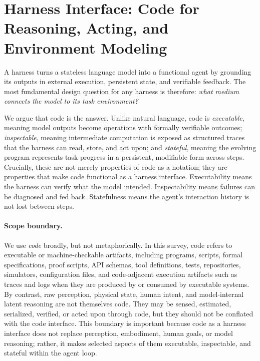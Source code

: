 \documentclass{llmxive}
\begin{document}
\tableofcontents


\section{Harness Interface: Code for Reasoning, Acting, and
Environment Modeling}
\label{sec:foundations}

A harness turns a stateless language model into a functional 
agent by grounding its outputs in external execution, persistent 
state, and verifiable feedback. The most fundamental design 
question for any harness is therefore: \emph{what medium 
connects the model to its task environment?}

We argue that code is the answer. Unlike natural language, code 
is \emph{executable}, meaning model outputs become operations 
with formally verifiable outcomes; \emph{inspectable}, meaning 
intermediate computation is exposed as structured traces that 
the harness can read, store, and act upon; and \emph{stateful}, 
meaning the evolving program represents task progress in a 
persistent, modifiable form across steps. Crucially, these are 
not merely properties of code as a notation; they are properties 
that make code functional as a harness interface. Executability 
means the harness can verify what the model intended. 
Inspectability means failures can be diagnosed and fed back. 
Statefulness means the agent's interaction history is not lost 
between steps.


\paragraph{Scope boundary.}
We use \emph{code} broadly, but not metaphorically. In this
survey, code refers to executable or machine-checkable artifacts,
including programs, scripts, formal specifications, proof scripts,
API schemas, tool definitions, tests, repositories, simulators,
configuration files, and code-adjacent execution artifacts such as
traces and logs when they are produced by or consumed by executable
systems. By contrast, raw perception, physical state, human intent,
and model-internal latent reasoning are not themselves code.
They may be sensed, estimated, serialized, verified, or acted upon
through code, but they should not be conflated with the code
interface. This boundary is important because code as a harness
interface does not replace perception, embodiment, human goals, or
model reasoning; rather, it makes selected aspects of them
executable, inspectable, and stateful within the agent loop.
\end{document}
